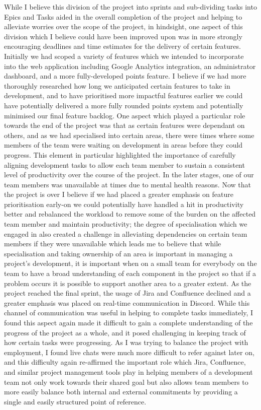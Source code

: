 \documentclass{scrreprt}
\begin{document}
While I believe this division of the project into sprints and sub-dividing tasks into Epics and Tasks aided in the overall completion of the project and helping to alleviate worries over the scope of the project, in hindsight, one aspect of this division which I believe could have been improved upon was in more strongly encouraging deadlines and time estimates for the delivery of certain features. Initially we had scoped a variety of features which we intended to incorporate into the web application including Google Analytics integration, an administrator dashboard, and a more fully-developed points feature. I believe if we had more thoroughly researched how long we anticipated certain features to take in development, and to have prioritised more impactful features earlier we could have potentially delivered a more fully rounded points system and potentially minimised our final feature backlog. One aspect which played a particular role towards the end of the project was that as certain features were dependant on others, and as we had specialised into certain areas, there were times where some members of the team were waiting on development in areas before they could progress. This element in particular highlighted the importance of carefully aligning development tasks to allow each team member to sustain a consistent level of productivity over the course of the project. In the later stages, one of our team members was unavailable at times due to mental health reasons. Now that the project is over I believe if we had placed a greater emphasis on feature prioritisation early-on we could potentially have handled a hit in productivity better and rebalanced the workload to remove some of the burden on the affected team member and maintain productivity; the degree of specialisation which we engaged in also created a challenge in alleviating dependencies on certain team members if they were unavailable which leads me to believe that while specialisation and taking ownership of an area is important in managing a project's development, it is important when on a small team for everybody on the team to have a broad understanding of each component in the project so that if a problem occurs it is possible to support another area to a greater extent.
\newline
\newline
As the project reached the final sprint, the usage of Jira and Confluence declined and a greater emphasis was placed on real-time communication in Discord. While this channel of communication was useful in helping to complete tasks immediately, I found this aspect again made it difficult to gain a complete understanding of the progress of the project as a whole, and it posed challenging in keeping track of how certain tasks were progressing. As I was trying to balance the project with employment, I found live chats were much more difficult to refer against later on, and this difficulty again re-affirmed the important role which Jira, Confluence, and similar project management tools play in helping members of a development team not only work towards their shared goal but also allows team members to more easily balance both internal and external commitments by providing a single and easily structured point of reference.
\end{document}
